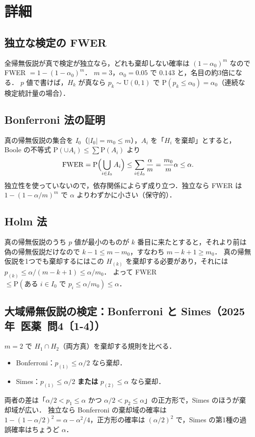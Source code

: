 \documentclass[a4paper,11pt,openany]{ltjsbook}
\newcommand{\kakomon}[2]{\mbox{#1年 医薬 問#2}}
\newcommand{\Prob}{\mathrm{P}}
\newcommand{\Unif}{\mathrm{U}}
\begin{document}
\section{詳細}\label{sec:m08-shosai}
\subsection{独立な検定の FWER}
全帰無仮説が真で検定が独立なら，どれも棄却しない確率は $(1-\alpha_0)^m$ なので FWER $=1-(1-\alpha_0)^m$．
$m=3$，$\alpha_0=0.05$ で $0.143$ と，名目の約3倍になる．
$p$ 値で書けば，$H_k$ が真なら $p_k\sim\Unif(0,1)$ で $\Prob(p_k\le\alpha_0)=\alpha_0$（連続な検定統計量の場合）．

\subsection{Bonferroni 法の証明}
真の帰無仮説の集合を $I_0$（$|I_0|=m_0\le m$），$A_i$ を「$H_i$ を棄却」とすると，Boole の不等式 $\Prob(\cup A_i)\le\sum\Prob(A_i)$ より
\[
\mathrm{FWER}=\Prob\Bigl(\bigcup_{i\in I_0}A_i\Bigr)\le\sum_{i\in I_0}\frac\alpha m=\frac{m_0}{m}\alpha\le\alpha .
\]
独立性を使っていないので，依存関係によらず成り立つ．独立なら FWER は $1-(1-\alpha/m)^m$ で $\alpha$ よりわずかに小さい（保守的）．

\subsection{Holm 法}
真の帰無仮説のうち $p$ 値が最小のものが $k$ 番目に来たとすると，それより前は偽の帰無仮説だけなので $k-1\le m-m_0$，すなわち $m-k+1\ge m_0$．
真の帰無仮説を1つでも棄却するにはこの $H_{(k)}$ を棄却する必要があり，それには $p_{(k)}\le\alpha/(m-k+1)\le\alpha/m_0$．
よって FWER $\le\Prob(\text{ある }i\in I_0\text{ で }p_i\le\alpha/m_0)\le\alpha$．

\subsection{大域帰無仮説の検定：Bonferroni と Simes（\kakomon{2025}{4}〔1-4〕）}
$m=2$ で $H_1\cap H_2$（両方真）を棄却する規則を比べる．
\begin{itemize}
\item Bonferroni：$p_{(1)}\le\alpha/2$ なら棄却．
\item Simes：$p_{(1)}\le\alpha/2$ \textbf{または} $p_{(2)}\le\alpha$ なら棄却．
\end{itemize}
両者の差は「$\alpha/2<p_1\le\alpha$ かつ $\alpha/2<p_2\le\alpha$」の正方形で，Simes のほうが棄却域が広い．
独立なら Bonferroni の棄却域の確率は $1-(1-\alpha/2)^2=\alpha-\alpha^2/4$，正方形の確率は $(\alpha/2)^2$ で，Simes の第1種の過誤確率はちょうど $\alpha$．
\end{document}
